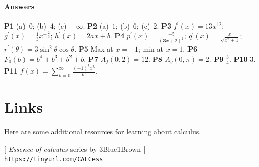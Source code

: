 \documentclass[10pt]{IEEEtran}
\newenvironment{Answer}[1]{\textbf{P#1}}{}
\begin{document}
	\paragraph{Answers}
	{ \small
		\begin{Answer}{1}
		(a)~$0$; (b)~$4$; (c)~$-\infty$.
		\end{Answer}
		\begin{Answer}{2}
		(a)~$1$; (b)~$6$; (c)~$2$.
		\end{Answer}
		\begin{Answer}{3}
		$f^{\prime\!}(x) = 13x^{12}$;
					$g^{\prime\!}(x) = \frac{1}{3} x^{-\frac{2}{3}}$;
					$h^{\prime\!}(x) = 2ax + b$.
		\end{Answer}
		\begin{Answer}{4}
		$p^{\prime\!}(x) = \frac{-5}{(3x + 2)^2}$;
					$q^{\prime\!}(x) = \frac{x}{\sqrt{ x^2 + 1}}$;
					$r^{\prime\!}(\theta) = 3\sin^2 \theta \cos\theta$.
		\end{Answer}
		\begin{Answer}{5}
		Max at $x = -1$; min at $x = 1$.
		\end{Answer}
		\begin{Answer}{6}
		$F_0(b) = b^4 + b^3 + b^2 + b$.
		\end{Answer}
		\begin{Answer}{7}
		$A_f(0,2) = 12$.
		\end{Answer}
		\begin{Answer}{8}
		$A_g(0,\pi)=2$.
		\end{Answer}
		\begin{Answer}{9}
		$\frac{3}{4}$.
		\end{Answer}
		\begin{Answer}{10}
		$3$.
		\end{Answer}
		\begin{Answer}{11}
		$f(x) = \sum_{k=0}^\infty \frac{(-1)^k x^k }{ k! }$.
		\end{Answer}
	}


\section{Links}
\label{calculus_prerequisites:links}

	Here are some additional resources for learning about calculus.

	[ \emph{Essence of calculus} series by 3Blue1Brown ] \\
	\href{https://www.youtube.com/playlist?list=PLZHQObOWTQDMsr9K-rj53DwVRMYO3t5Yr}
	{\texttt{https://tinyurl.com/CALCess}}
\end{document}
